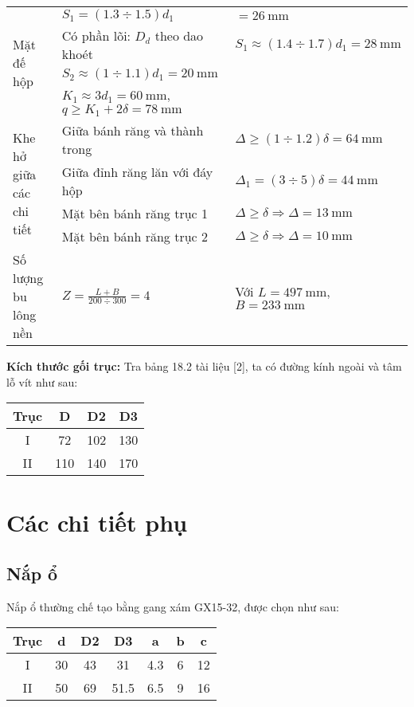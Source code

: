 \begin{table}[H]
\begin{tabular}{|l|l|l|}
\multirow{4}{*}{Mặt đế hộp} 
    & $S_1 = (1.3 \div 1.5)d_1$ & $= 26\ \text{mm}$ \\ \cline{2-3}
    & Có phần lõi: $D_d$ theo dao khoét & $S_1 \approx (1.4 \div 1.7)d_1 = 28\ \text{mm}$ \\ \cline{2-3}
    & $S_2 \approx (1 \div 1.1)d_1 = 20\ \text{mm}$ & \\ \cline{2-3}
    & $K_1 \approx 3d_1 = 60\ \text{mm}$, $q \geq K_1 + 2\delta = 78\ \text{mm}$ & \\ \hline
\multirow{4}{*}{Khe hở giữa các chi tiết} 
    & Giữa bánh răng và thành trong & $\Delta \geq (1 \div 1.2)\delta = 64\ \text{mm}$ \\ \cline{2-3}
    & Giữa đỉnh răng lăn với đáy hộp & $\Delta_1 = (3 \div 5)\delta = 44\ \text{mm}$ \\ \cline{2-3}
    & Mặt bên bánh răng trục 1 & $\Delta \geq \delta \Rightarrow \Delta = 13\ \text{mm}$ \\ \cline{2-3}
    & Mặt bên bánh răng trục 2 & $\Delta \geq \delta \Rightarrow \Delta = 10\ \text{mm}$ \\ \hline
Số lượng bu lông nền & $Z = \frac{L + B}{200 \div 300} = 4$ & Với $L = 497\ \text{mm}$, $B = 233\ \text{mm}$ \\ \hline
\end{tabular}
\end{table}

\textbf{Kích thước gối trục: }
Tra bảng 18.2 tài liệu [2], ta có đường kính ngoài và tâm lỗ vít như sau:

\begin{table}[H]
\centering
\begin{tabular}{|c|c|c|c|}
\hline
\textbf{Trục} & \textbf{D} & \textbf{D2} & \textbf{D3} \\ \hline
I   & 72  & 102 & 130 \\ \hline
II  & 110 & 140 & 170 \\ \hline
\end{tabular}
\end{table}

\section{Các chi tiết phụ}
\subsection{Nắp ổ}
Nắp ổ thường chế tạo bằng gang xám GX15-32, được chọn như sau:

\begin{table}[H]
\centering
\begin{tabular}{|c|c|c|c|c|c|c|}
\hline
\textbf{Trục} & \textbf{d} & \textbf{D2} & \textbf{D3} & \textbf{a} & \textbf{b} & \textbf{c} \\ \hline
I   & 30 & 43  & 31   & 4.3 & 6 & 12 \\ \hline
II  & 50 & 69  & 51.5 & 6.5 & 9 & 16 \\ \hline
\end{tabular}
\end{table}

